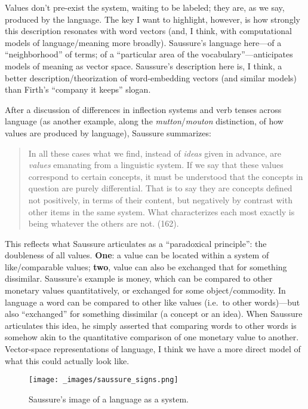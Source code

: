 \documentclass[
  12pt,
]{article}
\begin{document}
Values don't pre-exist the system, waiting to be labeled; they are, as
we say, produced by the language. The key I want to highlight, however,
is how strongly this description resonates with word vectors (and, I
think, with computational models of language/meaning more broadly).
Saussure's language here---of a ``neighborhood'' of terms; of a
``particular area of the vocabulary''---anticipates models of meaning as
vector space. Saussure's description here is, I think, a better
description/theorization of word-embedding vectors (and similar models)
than Firth's ``company it keeps'' slogan.

After a discussion of differences in inflection systems and verb tenses
across language (as another example, along the
\emph{mutton}/\emph{mouton} distinction, of how values are produced by
language), Saussure summarizes:

\begin{quote}
In all these cases what we find, instead of \emph{ideas} given in
advance, are \emph{values} emanating from a linguistic system. If we say
that these values correspond to certain concepts, it must be understood
that the concepts in question are purely differential. That is to say
they are concepts defined not positively, in terms of their content, but
negatively by contrast with other items in the same system. What
characterizes each most exactly is being whatever the others are not.
(162).
\end{quote}

This reflects what Saussure articulates as a ``paradoxical principle'':
the doubleness of all values. \textbf{One}: a value can be located
within a system of like/comparable values; \textbf{two}, value can also
be exchanged that for something dissimilar. Saussure's example is money,
which can be compared to other monetary values quantitatively, or
exchanged for some object/commodity. In language a word can be compared
to other like values (i.e.~to other words)---but also ``exchanged'' for
something dissimilar (a concept or an idea). When Saussure articulates
this idea, he simply asserted that comparing words to other words is
somehow akin to the quantitative comparison of one monetary value to
another. Vector-space representations of language, I think we have a
more direct model of what this could actually look like.

\par\begin{figure}\centering\texttt{[image: \_images/saussure\_signs.png]}\caption{Saussure’s image of a language as a system.}\end{figure}
\end{document}
